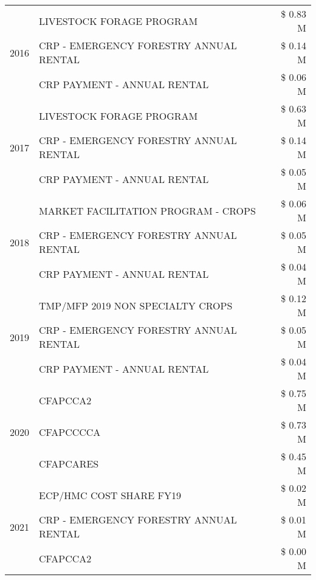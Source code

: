 \begin{tabular}{llr}
\cline{1-3}
\multirow[t]{3}{*}{2016} & LIVESTOCK FORAGE PROGRAM & \$ 0.83 M \\
 & CRP - EMERGENCY FORESTRY ANNUAL RENTAL & \$ 0.14 M \\
 & CRP PAYMENT - ANNUAL RENTAL & \$ 0.06 M \\
\cline{1-3}
\multirow[t]{3}{*}{2017} & LIVESTOCK FORAGE PROGRAM & \$ 0.63 M \\
 & CRP - EMERGENCY FORESTRY ANNUAL RENTAL & \$ 0.14 M \\
 & CRP PAYMENT - ANNUAL RENTAL & \$ 0.05 M \\
\cline{1-3}
\multirow[t]{3}{*}{2018} & MARKET FACILITATION PROGRAM - CROPS & \$ 0.06 M \\
 & CRP - EMERGENCY FORESTRY ANNUAL RENTAL & \$ 0.05 M \\
 & CRP PAYMENT - ANNUAL RENTAL & \$ 0.04 M \\
\cline{1-3}
\multirow[t]{3}{*}{2019} & TMP/MFP 2019 NON SPECIALTY CROPS & \$ 0.12 M \\
 & CRP - EMERGENCY FORESTRY ANNUAL RENTAL & \$ 0.05 M \\
 & CRP PAYMENT - ANNUAL RENTAL & \$ 0.04 M \\
\cline{1-3}
\multirow[t]{3}{*}{2020} & CFAPCCA2 & \$ 0.75 M \\
 & CFAPCCCCA & \$ 0.73 M \\
 & CFAPCARES & \$ 0.45 M \\
\cline{1-3}
\multirow[t]{3}{*}{2021} & ECP/HMC COST SHARE FY19 & \$ 0.02 M \\
 & CRP - EMERGENCY FORESTRY ANNUAL RENTAL & \$ 0.01 M \\
 & CFAPCCA2 & \$ 0.00 M \\
\cline{1-3}
\bottomrule
\end{tabular}
